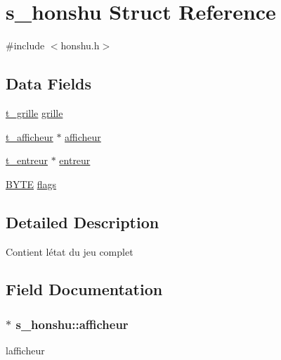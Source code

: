 \hypertarget{structs__honshu}{}\section{s\+\_\+honshu Struct Reference}
\label{structs__honshu}


{\ttfamily \#include $<$honshu.\+h$>$}

\subsection*{Data Fields}
\begin{DoxyCompactItemize}
\item 
\hyperlink{structs__grille}{t\+\_\+grille} \hyperlink{structs__honshu_acb56018a76f879eaf840281ef7522628}{grille}
\item 
\hyperlink{structs__afficheur}{t\+\_\+afficheur} $\ast$ \hyperlink{structs__honshu_a73a883f278f19723e0715682f1da9a4f}{afficheur}
\item 
\hyperlink{structs__entreur}{t\+\_\+entreur} $\ast$ \hyperlink{structs__honshu_aea4f7876bf6ca3a4137dcf5d6f845077}{entreur}
\item 
\hyperlink{types_8h_aec93e83855ac17c3c25c55c37ca186dd}{B\+Y\+TE} \hyperlink{structs__honshu_a3b5f869819428973745541c16b5d7c1a}{flags}
\end{DoxyCompactItemize}


\subsection{Detailed Description}
Contient l\textquotesingle{}état du jeu complet 

\subsection{Field Documentation}
\subsubsection[{\texorpdfstring{afficheur}{afficheur}}]{$\ast$ s\+\_\+honshu\+::afficheur}\hypertarget{structs__honshu_a73a883f278f19723e0715682f1da9a4f}{}\label{structs__honshu_a73a883f278f19723e0715682f1da9a4f}
l\textquotesingle{}afficheur 
